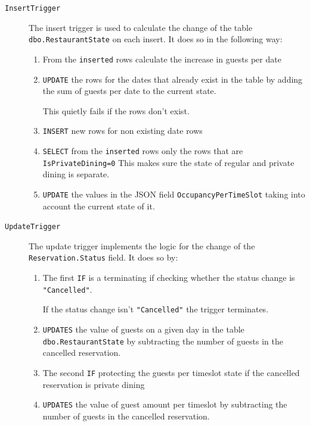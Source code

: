 \documentclass[12pt, a4paper]{article}
\begin{document}
\begin{description}
    \item[\texttt{InsertTrigger}] The insert trigger is used to calculate the change of the table \texttt{dbo.RestaurantState} on each insert. It does so in the following way:
    \begin{enumerate}
        \item From the \texttt{inserted} rows calculate the increase in guests per date
        \item \texttt{UPDATE} the rows for the dates that already exist in the table by adding the sum of guests per date to the current state.
        
        This quietly fails if the rows don't exist.

        \item \texttt{INSERT} new rows for non existing date rows
        \item \texttt{SELECT} from the \texttt{inserted} rows only the rows that are \texttt{IsPrivateDining=0}
        This makes sure the state of regular and private dining is separate.
        \item \texttt{UPDATE} the values in the JSON field \texttt{OccupancyPerTimeSlot} taking into account the current state of it.
    \end{enumerate}
    
    \item[\texttt{UpdateTrigger}] The update trigger implements the logic for the change of the \texttt{Reservation.Status} field. It does so by:
    \begin{enumerate}
        \item The first \texttt{IF} is a terminating if checking whether the status change is \texttt{"Cancelled"}.
        
        If the status change isn't \texttt{"Cancelled"} the trigger terminates.
        \item \texttt{UPDATES} the value of guests on a given day in the table \texttt{dbo.RestaurantState} by subtracting the number of guests in the cancelled reservation.
        \item The second \texttt{IF} protecting the guests per timeslot state if the cancelled reservation is private dining
        \item \texttt{UPDATES} the value of guest amount per timeslot by subtracting the number of guests in the cancelled reservation.
    \end{enumerate}
\end{description}
\end{document}
